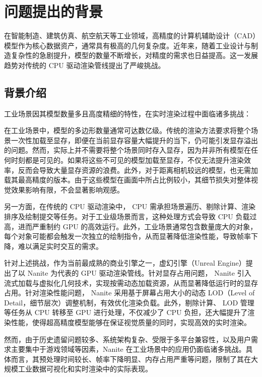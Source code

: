\section{问题提出的背景}

在智能制造、建筑仿真、航空航天等工业领域，高精度的计算机辅助设计（CAD）模型作为核心数据资产，通常具有极高的几何复杂度。近年来，随着工业设计与制造复杂性的急剧提升，模型的数量不断增长，对精度的需求也日益提高。这一发展趋势对传统的 CPU 驱动渲染管线提出了严峻挑战。

\subsection{背景介绍}

工业场景因其模型数量多且高度精细的特性，在实时渲染过程中面临诸多挑战：

在工业场景中，模型的多边形数量通常可达数亿级。传统的渲染方法要求将整个场景一次性加载至显存，即便在当前显存容量大幅提升的当下，仍可能引发显存溢出的问题。然而，实际上并不需要将整个场景同时存入显存，因为并非所有模型在任何时刻都是可见的。如果将这些不可见的模型加载至显存，不仅无法提升渲染效率，反而会导致大量显存资源的浪费。此外，对于距离相机较远的模型，也无需加载其最高精度的版本。由于这些模型在画面中所占比例较小，其细节损失对整体视觉效果影响有限，不会显著影响观感。

另一方面，在传统的 CPU 驱动渲染中， CPU 需承担场景遍历、剔除计算、渲染排序及绘制提交等任务。对于工业级场景而言，这种处理方式会导致 CPU 负载过高，进而严重制约 GPU 的高效运行\cite{pu2010}\cite{WangWei2011}。此外，工业场景通常包含数量庞大的对象，每个对象可能都会触发一次独立的绘制指令，从而显著降低渲染性能，导致帧率下降，难以满足实时交互的需求。

针对上述挑战，作为当前最成熟的商业引擎之一，虚幻引擎（Unreal Engine）提出了以 Nanite 为代表的 GPU 驱动渲染管线\cite{Nanite2022}。针对显存占用问题， Nanite 引入流式加载与虚拟化几何技术，实现按需动态加载资源，从而显著降低运行时的显存占用。针对渲染性能问题， Nanite 采用基于屏幕占用大小的动态 LOD（Level of Detail，细节层次）调整机制，有效优化渲染负载\cite{Overton2024}。此外，剔除计算、 LOD 管理等任务从 CPU 转移至 GPU 进行处理，不仅减少了 CPU 负担，还大幅提升了渲染性能，使得超高精度模型能够在保证视觉质量的同时，实现高效的实时渲染。

然而，由于历史遗留问题较多、系统架构复杂、受限于多平台兼容性，以及用户需求主要集中于游戏领域等因素，Nanite 在工业场景中的应用仍面临诸多挑战。具体而言，其预处理时间较长、帧率下降明显、内存占用严重等问题，限制了其在大规模工业数据可视化和实时渲染中的实际表现。

